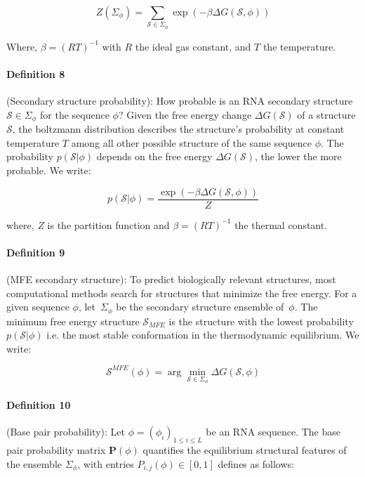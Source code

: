 \begin{equation}
	Z(\Sigma_{\phi}) = \sum_{\mathcal{S} \in \Sigma_{\phi} }{\exp(-\beta \Delta G(\mathcal{S}, \phi))}
\end{equation}

Where, $\beta = (RT)^{-1}$ with $R$ the ideal gas constant, and $T$ the temperature.

\paragraph{\textbf{Definition 8}} (Secondary structure probability):
How probable is an RNA secondary structure $\mathcal{S} \in \Sigma_{\phi}$ for the sequence $\phi$? Given the free energy change $\Delta G(\mathcal{S})$ of a structure $\mathcal{S}$, the boltzmann distribution describes the structure's probability at constant temperature $T$ among all other possible structure of the same sequence $\phi$.
The probability $p(\mathcal{S}| \phi)$ depends on the free energy $\Delta G(\mathcal{S})$, the lower the more probable. We write: 

\begin{equation}
	p(\mathcal{S}| \phi)= \frac{\exp(-\beta \Delta G(\mathcal{S}, \phi))}{Z}
\end{equation}

where, $Z$ is the partition function and $\beta = (RT)^{-1}$ the thermal constant. 


\paragraph{\textbf{Definition 9}} (MFE secondary structure): 
To predict biologically relevant structures, most computational methods search for structures that minimize the free energy. For a given sequence $\phi$, let~\(\Sigma_{\phi}\) be the secondary structure ensemble of~\(\phi\). The minimum free energy structure $\mathcal{S}_{MFE}$ is the structure with the lowest probability $p(\mathcal{S}|\phi)$ i.e. the  most stable conformation in the thermodynamic equilibrium. We write:

\begin{equation}
\mathcal{S}^{MFE}(\phi) = \arg \min_{\mathcal{S} \in \Sigma_{\phi}} \Delta G(\mathcal{S}, \phi) 
\end{equation}

\paragraph{\textbf{Definition 10}}(Base pair probability): Let $\phi=(\phi_i)_{1\leq i \leq L} $ be an RNA sequence. The base pair probability matrix $\mathbf{P}(\phi)$ quantifies the equilibrium structural features of the ensemble $\Sigma_{\phi}$, with entries $P_{i,j}(\phi) \in [ 0,1]$ defines as follows: 

